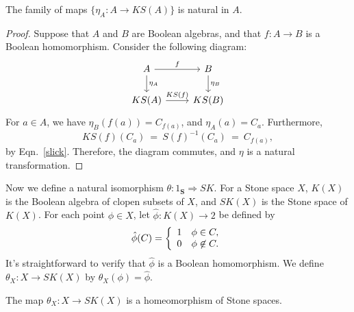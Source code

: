 \begin{lemma} The family of maps $\{ \eta _A:A\to KS(A) \}$ is natural
  in $A$.  \end{lemma}

\begin{proof} Suppose that $A$ and $B$ are Boolean algebras, and that
  $f:A\to B$ is a Boolean homomorphism.  Consider the following
  diagram:
\[ \begin{tikzcd}
  A \arrow{d}{\eta _A} \arrow{r}{f} & B \arrow{d}{\eta _B} \\
  KS(A) \arrow{r}{KS(f)} & KS(B) \end{tikzcd} \] For $a\in A$, we have
$\eta _B(f(a))=C_{f(a)}$, and $\eta _A(a)=C_a$.  Furthermore,
\[ KS(f)(C_a) \: = \: S(f)^{-1}(C_a) \: = \: C_{f(a)} ,\] by Eqn.\
\ref{slick}.  Therefore, the diagram commutes, and $\eta$ is a natural
transformation. \end{proof}

Now we define a natural isomorphism $\theta :1_{\mathbf{S}}\Rightarrow
SK$.  For a Stone space $X$, $K(X)$ is the Boolean algebra of clopen
subsets of $X$, and $SK(X)$ is the Stone space of $K(X)$.  For each
point $\phi \in X$, let $\hat{\phi}:K(X)\to 2$ be defined by
\[ \hat{\phi }(C) = \left\{ \begin{array}{l l} 1 & \phi\in C , \\ 0 &
    \phi\not\in C .\end{array}\right. \] It's straightforward to
verify that $\hat{\phi}$ is a Boolean homomorphism.  We define $\theta
_X:X\to SK(X)$ by $\theta _X(\phi )=\hat{\phi}$.  

\begin{lemma} The map $\theta _X:X\to SK(X)$ is a homeomorphism of
  Stone spaces. \end{lemma} 

